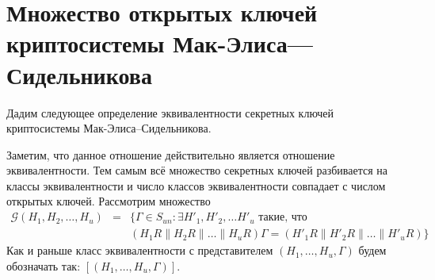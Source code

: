 
\section[Множество открытых ключей криптосистемы Мак-Элиса---Си\-дель\-ни\-кова]{Множество открытых ключей криптосистемы Мак-Элиса---Сидельникова}

Дадим следующее определение эквивалентности секретных ключей
криптосистемы Мак-Элиса--Сидельникова. 

Заметим, что данное отношение действительно является отношение
эквивалентности. Тем самым всё множество секретных ключей
разбивается на классы эквивалентности и число классов
эквивалентности совпадает с числом открытых ключей. Рассмотрим
множество
\begin{eqnarray*}
\mathcal G(H_1,H_2,\ldots,H_u)&=&\{\Gamma\in S_{un}:
\exists H'_1,H'_2,\ldots H'_u \text{ такие, что }\\
&&(H_1R\|H_2R\|\ldots\|H_uR)\Gamma=(H'_1R\|H'_2R\|\ldots\|H'_uR)\}
\end{eqnarray*}
Как и раньше класс эквивалентности с представителем
$(H_1,\ldots,H_u,\Gamma)$ будем обозначать так:
$[(H_1,\ldots,H_u,\Gamma)]$.

